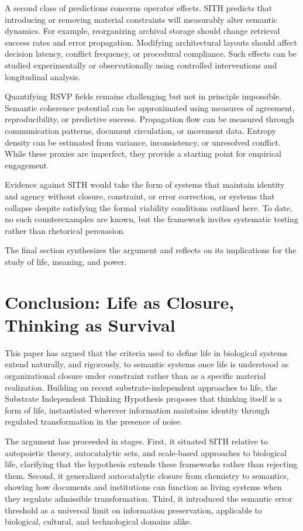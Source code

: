 \documentclass[11pt,oneside]{article}
\begin{document}
A second class of predictions concerns operator effects. SITH predicts that introducing or removing material constraints will measurably alter semantic dynamics. For example, reorganizing archival storage should change retrieval success rates and error propagation. Modifying architectural layouts should affect decision latency, conflict frequency, or procedural compliance. Such effects can be studied experimentally or observationally using controlled interventions and longitudinal analysis.

Quantifying RSVP fields remains challenging but not in principle impossible. Semantic coherence potential can be approximated using measures of agreement, reproducibility, or predictive success. Propagation flow can be measured through communication patterns, document circulation, or movement data. Entropy density can be estimated from variance, inconsistency, or unresolved conflict. While these proxies are imperfect, they provide a starting point for empirical engagement.

Evidence against SITH would take the form of systems that maintain identity and agency without closure, constraint, or error correction, or systems that collapse despite satisfying the formal viability conditions outlined here. To date, no such counterexamples are known, but the framework invites systematic testing rather than rhetorical persuasion.

The final section synthesizes the argument and reflects on its implications for the study of life, meaning, and power.


\section{Conclusion: Life as Closure, Thinking as Survival} 

This paper has argued that the criteria used to define life in biological systems extend naturally, and rigorously, to semantic systems once life is understood as organizational closure under constraint rather than as a specific material realization. Building on recent substrate-independent approaches to life, the Substrate Independent Thinking Hypothesis proposes that thinking itself is a form of life, instantiated wherever information maintains identity through regulated transformation in the presence of noise.

The argument has proceeded in stages. First, it situated SITH relative to autopoietic theory, autocatalytic sets, and scale-based approaches to biological life, clarifying that the hypothesis extends these frameworks rather than rejecting them. Second, it generalized autocatalytic closure from chemistry to semantics, showing how documents and institutions can function as living systems when they regulate admissible transformation. Third, it introduced the semantic error threshold as a universal limit on information preservation, applicable to biological, cultural, and technological domains alike.
\end{document}
